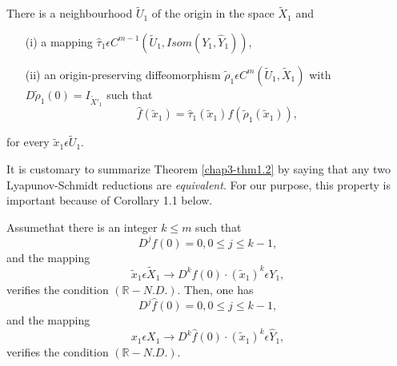 \begin{theorem}\label{chap3-thm1.2}
There is a neighbourhood $\widetilde{U}_{1}$ of the origin in the
space $\widetilde{X}_{1}$ and
\begin{enumerate}
\item[(i)] a mapping $\hat{\tau}_{1} \epsilon C^{m-1}
  (\widetilde{U}_{1}, Isom (Y_{1}, \hat{Y}_{1}))$,

\item[(ii)] an origin-preserving diffeomorphism $\widetilde{\rho}_{1}
  \epsilon C^{m} (\widetilde{U}_{1}, \widetilde{X}_{1})$ with\break
  $D\widetilde{\rho}_{1}(0) = I_{\widetilde{X}'_{1}}$ such that
\begin{equation*}
\hat{f}(\widetilde{x}_{1}) = \hat{\tau}_{1}(\widetilde{x}_{1})
f(\widetilde{\rho}_{1} (\widetilde{x}_{1})),\tag{1.23}\label{chap3-eq1.23}
\end{equation*}
\end{enumerate}
for every $\widetilde{x}_{1} \epsilon \widetilde{U}_{1}$.
\end{theorem}

\begin{remark}\label{chap3-rem1.1}
It is customary to summarize Theorem \ref{chap3-thm1.2} by saying that
any two Lyapunov-Schmidt reductions are {\em equivalent}. For our
purpose, this property is important because of Corollary
1.1 below. 
\end{remark}


\setcounter{corollary}{1}
\begin{corollary}\label{chap3-coro1.2}
Assume\pageoriginale that there is an integer $k \leq m$ such that
$$
D^{j}f(0) = 0, 0 \leq j \leq k-1,
$$
and the mapping
\begin{equation*}
\widetilde{x}_{1} \epsilon \widetilde{X}_{1} \to D^{k}f(0) \cdot
(\widetilde{x}_{1})^{k} \epsilon Y_{1},\tag{1.24}\label{chap3-eq1.24}
\end{equation*}
verifies the condition $(\mathbb{R}-N.D.)$. Then, one has
$$
D^{j}\hat{f}(0) = 0, 0 \leq j \leq k-1,
$$
and the mapping
\begin{equation*}
x_{1} \epsilon X_{1} \to D^{k}\hat{f}(0) \cdot (\widetilde{x}_{1})^{k}
\epsilon \hat{Y}_{1},\tag{1.25}\label{chap3-eq1.25}
\end{equation*}
verifies the condition $(\mathbb{R}-N.D.)$.
\end{corollary}

